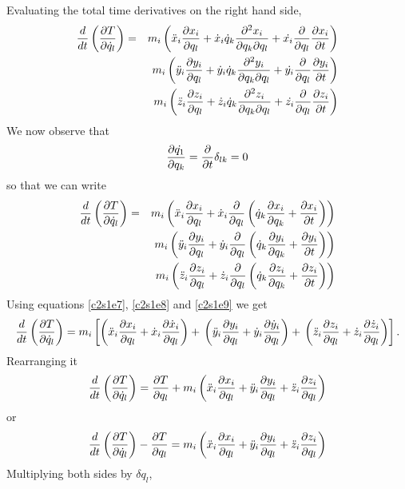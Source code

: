 Evaluating the total time derivatives on the right hand side,
\begin{eqnarray}
\frac{d}{dt}\left(\frac{\partial{T}}{\partial{\dot{q}_l}}\right) &=& 
 m_i\left(\ddot{x}_i\frac{\partial{x_i}}{\partial{q_l}} + 
 \dot{x}_i\dot{q}_k\frac{\partial^2 x_i}{\partial q_k\partial q_l} +
 \dot{x_i}\frac{\partial}{\partial q_l}\frac{\partial{x_i}}{\partial{t}}\right) \nonumber \\
 & & m_i\left(\ddot{y}_i\frac{\partial{y_i}}{\partial{q_l}} + 
 \dot{y}_i\dot{q}_k\frac{\partial^2 y_i}{\partial q_k\partial q_l} +
 \dot{y_i}\frac{\partial}{\partial q_l}\frac{\partial{y_i}}{\partial{t}}\right) \nonumber \\
 & & m_i\left(\ddot{z}_i\frac{\partial{z_i}}{\partial{q_l}} + 
 \dot{z}_i\dot{q}_k\frac{\partial^2 z_i}{\partial q_k\partial q_l} +
 \dot{z_i}\frac{\partial}{\partial q_l}\frac{\partial{z_i}}{\partial{t}}\right) \label{c2s1e14}
\end{eqnarray}
We now observe that
\[
\frac{\partial{\dot{q_1}}}{\partial{q_k}} = \frac{\partial}{\partial t}\delta_{lk} = 0
\]
so that we can write
\begin{eqnarray}
\frac{d}{dt}\left(\frac{\partial{T}}{\partial{\dot{q}_l}}\right) &=& 
 m_i\left(\ddot{x}_i\frac{\partial{x_i}}{\partial{q_l}} + 
 \dot{x}_i\frac{\partial}{\partial q_l}
 \left(\dot{q}_k\frac{\partial{x_i}}{\partial{q_k}} + \frac{\partial{x_i}}{\partial{t}}\right)\right) \nonumber \\
 & &  m_i\left(\ddot{y}_i\frac{\partial{y_i}}{\partial{q_l}} + 
 \dot{y}_i\frac{\partial}{\partial q_l}
 \left(\dot{q}_k\frac{\partial{y_i}}{\partial{q_k}} + \frac{\partial{y_i}}{\partial{t}}\right)\right) \nonumber \\
 & &  m_i\left(\ddot{z}_i\frac{\partial{z_i}}{\partial{q_l}} + 
 \dot{z}_i\frac{\partial}{\partial q_l}
 \left(\dot{q}_k\frac{\partial{z_i}}{\partial{q_k}} + \frac{\partial{z_i}}{\partial{t}}\right)\right) \label{c2s1e15}
\end{eqnarray}
Using equations \eqref{c2s1e7}, \eqref{c2s1e8} and \eqref{c2s1e9} we get
\[
\frac{d}{dt}\left(\frac{\partial{T}}{\partial{\dot{q}_l}}\right) =
m_i\left[\left(\ddot{x}_i\frac{\partial{x_i}}{\partial{q_l}} + \dot{x}_i\frac{\partial{\dot{x}_i}}{\partial{{q}_l}}\right) 
 + \nonumber \\
\left(\ddot{y}_i\frac{\partial{y_i}}{\partial{q_l}} + \dot{y}_i\frac{\partial{\dot{y}_i}}{\partial{{q}_l}}\right) 
 + \nonumber \\
\left(\ddot{z}_i\frac{\partial{z_i}}{\partial{q_l}} + \dot{z}_i\frac{\partial{\dot{z}_i}}{\partial{{q}_l}}\right)\right].
\]
Rearranging it
\[
\frac{d}{dt}\left(\frac{\partial{T}}{\partial{\dot{q}_l}}\right) =
\frac{\partial{T}}{\partial{q_l}} + m_i\left(\ddot{x}_i\frac{\partial{x_i}}{\partial{q_l}} +
\ddot{y}_i\frac{\partial{y_i}}{\partial{q_l}} +\ddot{z}_i\frac{\partial{z_i}}{\partial{q_l}}\right)
\]
or
\begin{equation}\label{c2s1e16}
\frac{d}{dt}\left(\frac{\partial{T}}{\partial{\dot{q}_l}}\right) - \frac{\partial{T}}{\partial{q_l}} =
 m_i\left(\ddot{x}_i\frac{\partial{x_i}}{\partial{q_l}} +
 \ddot{y}_i\frac{\partial{y_i}}{\partial{q_l}} +\ddot{z}_i\frac{\partial{z_i}}{\partial{q_l}}\right)
\end{equation}
Multiplying both sides by $\delta q_l$,
